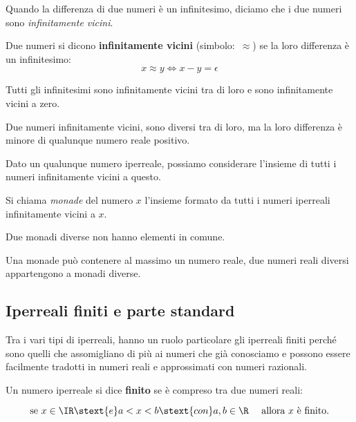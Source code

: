 Quando la differenza di due numeri è un infinitesimo, diciamo 
che i due numeri sono \emph{infinitamente vicini}.

\begin{definizione}    %
Due numeri si dicono \textbf{infinitamente vicini} (simbolo:~\(\approx\)) se 
la loro differenza è un infinitesimo:
\[x \approx y \Leftrightarrow x - y = \epsilon\]
\end{definizione}

Tutti gli infinitesimi sono infinitamente vicini tra di loro e sono 
infinitamente vicini a zero.

Due numeri infinitamente vicini, sono diversi tra di loro, ma la loro 
differenza è minore di qualunque numero reale positivo.

Dato un qualunque numero iperreale, possiamo considerare l'insieme di tutti 
i numeri infinitamente vicini a questo. 

\begin{definizione}
 Si chiama \emph{monade} del numero \(x\) l'insieme formato da tutti i 
numeri iperreali infinitamente vicini a \(x\).
\end{definizione}

Due monadi diverse non hanno elementi in comune.

Una monade può contenere al massimo un numero reale, due numeri reali 
diversi appartengono a monadi diverse.

\subsection{Iperreali finiti e parte standard}
\label{subsec:insnum_partestandard}

Tra i vari tipi di iperreali, hanno un ruolo particolare gli iperreali 
finiti perché sono quelli che assomigliano di più ai numeri che già 
conosciamo e possono essere facilmente tradotti in numeri reali e 
approssimati con numeri razionali. 

\begin{definizione}
 Un numero iperreale si dice \textbf{finito} se è compreso tra 
due numeri reali:

\[\text{se } x \in \IR \stext{e}  a < x < b \stext{con} 
  a, b \in \R \quad \text{ allora } x \text{ è finito.}\]
\end{definizione}

